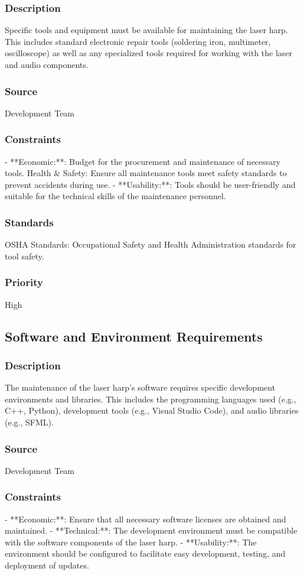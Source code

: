 \subsubsection{Description}
Specific tools and equipment must be available for maintaining the laser harp. This includes standard electronic repair tools (soldering iron, multimeter, oscilloscope) as well as any specialized tools required for working with the laser and audio components.
\subsubsection{Source}
Development Team
\subsubsection{Constraints}
- **Economic:**: Budget for the procurement and maintenance of necessary tools.
Health & Safety: Ensure all maintenance tools meet safety standards to prevent accidents during use.
- **Usability:**: Tools should be user-friendly and suitable for the technical skills of the maintenance personnel.
\subsubsection{Standards}
OSHA Standards: Occupational Safety and Health Administration standards for tool safety.
\subsubsection{Priority}
High


\subsection{Software and Environment Requirements}
\subsubsection{Description}
The maintenance of the laser harp's software requires specific development environments and libraries. This includes the programming languages used (e.g., C++, Python), development tools (e.g., Visual Studio Code), and audio libraries (e.g., SFML).
\subsubsection{Source}
Development Team
\subsubsection{Constraints}
- **Economic:**: Ensure that all necessary software licenses are obtained and maintained.
- **Technical:**: The development environment must be compatible with the software components of the laser harp.
- **Usability:**: The environment should be configured to facilitate easy development, testing, and deployment of updates.

